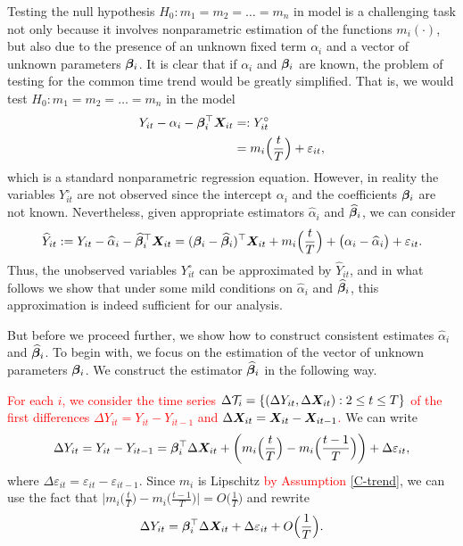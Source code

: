 \documentclass[a4paper,12pt]{article}
\makeatletter
\renewcommand{\eqref}[1]{\tagform@{\ref{#1}}}
\makeatother
\begin{document}
Testing the null hypothesis $H_0: m_1 = m_2 = \ldots = m_n$ in model \eqref{eq:model_full} is a challenging task not only because it involves nonparametric estimation of the functions $m_i(\cdot)$, but also due to the presence of an unknown fixed term $\alpha_i$ and a vector of unknown parameters $\bm{\beta}_i$. It is clear that if $\alpha_i$ and $\bm{\beta}_i$ are known, the problem of testing for the common time trend would be greatly simplified. That is, we would test $H_0: m_1 = m_2 = \ldots = m_n$ in the model
\begin{align*}
Y_{it} - \alpha_i - \bm{\beta}_i^\top \boldsymbol{X}_{it} & =: Y_{it}^\circ\\
					& = m_i \Big( \frac{t}{T} \Big) + \varepsilon_{it}, 
\end{align*}
which is a standard nonparametric regression equation. However, in reality the variables $Y_{it}^\circ$ are not observed since the intercept $\alpha_i$ and the coefficients $\bm{\beta}_i$ are not known. Nevertheless, given appropriate estimators $\widehat{\alpha}_i$ and $\widehat{\bm{\beta}}_i$, we can consider
\begin{align*}
\widehat{Y}_{it} := Y_{it} -\widehat{\alpha}_i - \widehat{\bm{\beta}}_i^\top \boldsymbol{X}_{it} =(\bm{\beta}_i - \widehat{\bm{\beta}}_i)^\top \boldsymbol{X}_{it} + m_i \Big( \frac{t}{T} \Big) + \big( \alpha_i - \widehat{\alpha}_i \big) + \varepsilon_{it}. 
\end{align*}
Thus, the unobserved variables $Y_{it}^\circ$ can be approximated by $\widehat{Y}_{it}$, and in what follows we show that under some mild conditions on $\widehat{\alpha}_i$ and $\widehat{\bm{\beta}}_i$, this approximation is indeed sufficient for our analysis. 

But before we proceed further, we show how to construct consistent estimates $\widehat{\alpha}_i$ and $\widehat{\bm{\beta}}_i$. To begin with, we focus on the estimation of the vector of unknown parameters $\bm{\beta}_i$. We construct the estimator  $\widehat{\bm{\beta}}_i$ in the following way.

\textcolor{red}{For each $i$, we consider the time series $\Delta \mathcal{T}_i = \{(\Delta Y_{it}, \Delta \boldsymbol{X}_{it}): 2 \leq t \leq T\}$ of the first differences $\Delta Y_{it} = Y_{it} - Y_{i t-1}$ and $\Delta  \boldsymbol{X}_{it} =  \boldsymbol{X}_{it} -  \boldsymbol{X}_{it-1}$.} We can write
\begin{align*}
	\Delta Y_{it} = Y_{it} - Y_{i t-1} =\bm{\beta}_i^\top \Delta \boldsymbol{X}_{it} + \bigg(m_i \Big( \frac{t}{T} \Big) - m_i \Big(\frac{t-1}{T}\Big)\bigg) + \Delta \varepsilon_{it},
\end{align*}
where $ \Delta \varepsilon_{it} = \varepsilon_{it} - \varepsilon_{i t-1}$. Since $m_i$ is Lipschitz \textcolor{red}{by Assumption \ref{C-trend}}, we can use the fact that $ \big|m_i \big( \frac{t}{T} \big) - m_i \big(\frac{t-1}{T}\big) \big| = O\big(\frac{1}{T}\big)$ and rewrite 
\begin{align}\label{model_with_regs}
	\Delta Y_{it} = \bm{\beta}_i^\top \Delta \boldsymbol{X}_{it} + \Delta \varepsilon_{it} + O\Big(\frac{1}{T}\Big).
\end{align}
\end{document}
